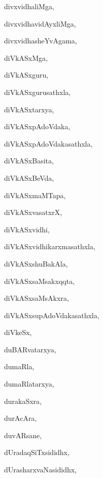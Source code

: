 \begin{multicols}{3}
{\noindent
{divxvidhaliMga}, \pageref{divxvidhaliMga}

\noindent
{divxvidhavidAyxliMga}, \pageref{divxvidhavidAyxliMga}

\noindent
{divxvidhasheYvAgama}, \pageref{divxvidhasheYvAgama}

\noindent
{diVkASxMga}, \pageref{diVkASxMga}

\noindent
{diVkASxguru}, \pageref{diVkASxguru}

\noindent
{diVkASxgurusathxla}, \pageref{diVkASxgurusathxla}

\noindent
{diVkASxtarxya}, \pageref{diVkASxtarxya}

\noindent
{diVkASxpAdoVdaka}, \pageref{diVkASxpAdoVdaka}

\noindent
{diVkASxpAdoVdakasathxla}, \pageref{diVkASxpAdoVdakasathxla}

\noindent
{diVkASxBasita}, \pageref{diVkASxBasita}

\noindent
{diVkASxBeVda}, \pageref{diVkASxBeVda}

\noindent
{diVkASxmaMTapa}, \pageref{diVkASxmaMTapa}

\noindent
{diVkASxvasatxrX}, \pageref{diVkASxvasatxrX}

\noindent
{diVkASxvidhi}, \pageref{diVkASxvidhi}

\noindent
{diVkASxvidhikarxmasathxla}, \pageref{diVkASxvidhikarxmasathxla}

\noindent
{diVkASxshuBakAla}, \pageref{diVkASxshuBakAla}

\noindent
{diVkASxsaMsakxqqta}, \pageref{diVkASxsaMsakxqqta}

\noindent
{diVkASxsaMsAkxra}, \pageref{diVkASxsaMsAkxra}

\noindent
{diVkASxsupAdoVdakasathxla}, \pageref{diVkASxsupAdoVdakasathxla}

\noindent
{diVkeSx}, \pageref{diVkeSx}

\noindent
{duBARvatarxya}, \pageref{duBARvatarxya}

\noindent
{dumaRla}, \pageref{dumaRla}

\noindent
{dumaRlatarxya}, \pageref{dumaRlatarxya}

\noindent
{durakaSxra}, \pageref{durakaSxra}

\noindent
{durAcAra}, \pageref{durAcAra}

\noindent
{duvARsane}, \pageref{duvARsane}

\noindent
{dUradaqSiTxsididhx}, \pageref{dUradaqSiTxsididhx}

\noindent
{dUrasharxvaNasididhx}, \pageref{dUrasharxvaNasididhx}

}
\end{multicols}

